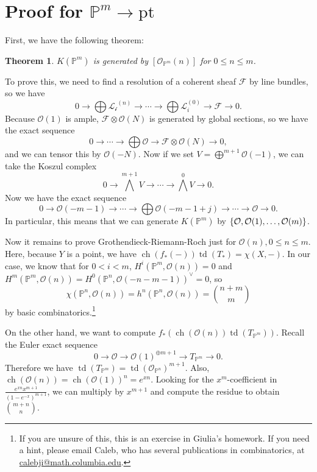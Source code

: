 \documentclass[leqno, openany]{memoir}
\newtheorem{thm}{Theorem}[section]
\theoremstyle{definition}
\theoremstyle{remark}
\theoremstyle{plain}
\theoremstyle{definition}
\theoremstyle{remark}
\renewcommand{\P}{\mathbb{P}}
\newcommand{\mc}[1]{\mathcal{#1}}
\newcommand{\mr}[1]{\mathrm{#1}}
\DeclareMathOperator{\ch}{ch}
\DeclareMathOperator{\td}{td}
\begin{document}
\section{Proof for $\P^m \to \mr{pt}$}%

First, we have the following theorem: \begin{thm} $K(\P^m)$ is generated by
$[\mc{O}_{\P^m}(n)]$ for $0 \leq n \leq m$.  \end{thm}

To prove this, we need to find a resolution of a coherent sheaf $\mc{F}$ by
line bundles, so we have \[ 0 \to \bigoplus \mc{L_i}^{(n)} \to \cdots \to
\bigoplus \mc{L}_i^{(0)} \to \mc{F} \to 0. \] Because $\mc{O}(1)$ is ample,
$\mc{F} \otimes \mc{O}(N)$ is generated by global sections, so we have the
exact sequence \[ 0 \to \cdots \to \bigoplus \mc{O} \to \mc{F} \otimes
    \mc{O}(N) \to 0, \] and we can tensor this by $\mc{O}(-N)$. Now if we set
    $V = \bigoplus^{m+1} \mc{O}(-1)$, we can take the Koszul complex \[ 0 \to
    {\bigwedge}^{m+1} V \to \cdots \to {\bigwedge}^0 V \to 0. \] Now we have
    the exact sequence \[ 0 \to \mc{O}(-m-1) \to \cdots \to \bigoplus
    \mc{O}(-m-1+j) \to \cdots \to \mc{O} \to 0. \] In particular, this means
    that we can generate $K(\P^m)$ by $\qty{\mc{O}, \mc{O}(1), \ldots,
    \mc{O}(m)}$.

Now it remains to prove Grothendieck-Riemann-Roch just for $\mc{O}(n), 0 \leq n
\leq m$. Here, because $Y$ is a point, we have $\ch(f_*(-)) \td(T_*) = \chi(X,
-)$. In our case, we know that for $0 < i < m$, $H^i(\P^m, \mc{O}(n)) = 0$ and
$H^m(\P^m, \mc{O}(n)) = {H^0(\P^n, \mc{O}(-n-m-1))}^{\vee} = 0$, so \[
\chi(\P^n, \mc{O}(n)) = h^n(\P^n, \mc{O}(n)) = \binom{n+m}{m} \] by basic
combinatorics.\footnote{If you are unsure of this, this is an exercise in
Giulia's homework. If you need a hint, please email Caleb, who has several
publications in combinatorics, at \url{calebji@math.columbia.edu}.}

On the other hand, we want to compute $f_*(\ch(\mc{O}(n)) \td(T_{\P^m}))$.
Recall the Euler exact sequence \[ 0 \to \mc{O} \to {\mc{O}(1)}^{\oplus m+1}
\to T_{\P^m} \to 0. \] Therefore we have $\td(T_{ \P^m }) = {
\td(\mc{O}_{\P^n}) }^{m+1}$. Also, $\ch(\mc{O}(n)) = { \ch(\mc{O}(1)) }^n =
e^{xn}$. Looking for the $x^m$-coefficient in $\frac{e^{xn}
x^{m+1}}{{(1-e^{-x})}^{m+1}}$, we can multiply by $x^{m+1}$ and compute the
residue to obtain $\binom{m+n}{n}$.
\end{document}
